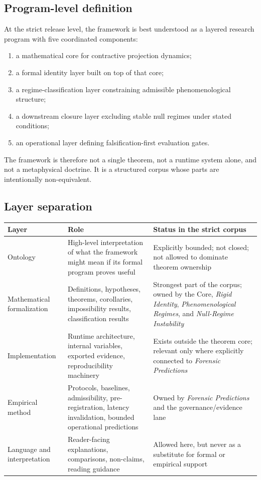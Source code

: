 \documentclass[11pt,a4paper]{article}
\begin{document}
\subsection{Program-level definition}

At the strict release level, the framework is best understood as a layered research program with five coordinated components:
\begin{enumerate}[leftmargin=*]
\item a mathematical core for contractive projection dynamics;
\item a formal identity layer built on top of that core;
\item a regime-classification layer constraining admissible phenomenological structure;
\item a downstream closure layer excluding stable null regimes under stated conditions;
\item an operational layer defining falsification-first evaluation gates.
\end{enumerate}

The framework is therefore not a single theorem, not a runtime system alone, and not a metaphysical doctrine. It is a structured corpus whose parts are intentionally non-equivalent.

\subsection{Layer separation}

\begin{longtable}{p{} p{} p{}}
\toprule
\textbf{Layer} & \textbf{Role} & \textbf{Status in the strict corpus} \\
\midrule
\endhead
Ontology & High-level interpretation of what the framework might mean if its formal program proves useful & Explicitly bounded; not closed; not allowed to dominate theorem ownership \\
Mathematical formalization & Definitions, hypotheses, theorems, corollaries, impossibility results, classification results & Strongest part of the corpus; owned by the Core, \textit{Rigid Identity}, \textit{Phenomenological Regimes}, and \textit{Null-Regime Instability} \\
Implementation & Runtime architecture, internal variables, exported evidence, reproducibility machinery & Exists outside the theorem core; relevant only where explicitly connected to \textit{Forensic Predictions} \\
Empirical method & Protocols, baselines, admissibility, pre-registration, latency invalidation, bounded operational predictions & Owned by \textit{Forensic Predictions} and the governance/evidence lane \\
Language and interpretation & Reader-facing explanations, comparisons, non-claims, reading guidance & Allowed here, but never as a substitute for formal or empirical support \\
\bottomrule
\end{longtable}
\end{document}
